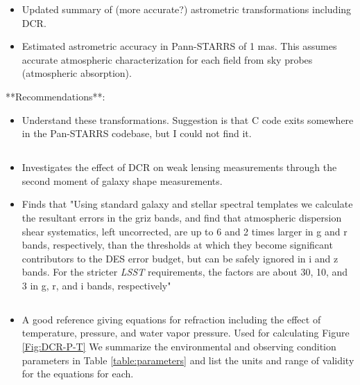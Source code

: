 \documentclass[DM,authoryear,toc]{lsstdoc}
\begin{document}
\begin{itemize}
	\item Updated summary of (more accurate?) astrometric transformations including DCR.
	\item Estimated astrometric accuracy in Pann-STARRS of 1
          mas. This assumes accurate atmospheric characterization for
          each field from sky probes (atmospheric absorption).
\end{itemize}

**Recommendations**:
\begin{itemize}
	\item Understand these transformations. Suggestion is that C
          code exits somewhere in the Pan-STARRS codebase, but I could
          not find it.
\end{itemize}

\subsection{\cite{2012PASP..124.1113A}}
\begin{itemize}
	\item Investigates the effect of DCR on weak lensing measurements through the second moment of galaxy shape measurements.
	\item Finds that "Using standard galaxy and stellar spectral templates we calculate the resultant errors in the griz bands, and find that atmospheric dispersion shear systematics, left uncorrected, are up to 6 and 2 times larger in g and r bands, respectively, than the thresholds at which they become significant contributors to the DES error budget, but can be safely ignored in i and z bands. For the stricter \textit{LSST} requirements, the factors are about 30, 10, and 3 in g, r, and i bands, respectively"
\end{itemize}

\subsection{\cite{1996PASP..108.1051S}}
\begin{itemize}
	\item A good reference giving equations for refraction
          including the effect of temperature, pressure, and water
          vapor pressure. Used for calculating Figure
          \ref{Fig:DCR-P-T}
          We summarize the environmental and observing condition parameters in Table \ref{table:parameters} and list the units and range of validity for the equations for each.

\end{itemize}
\end{document}
